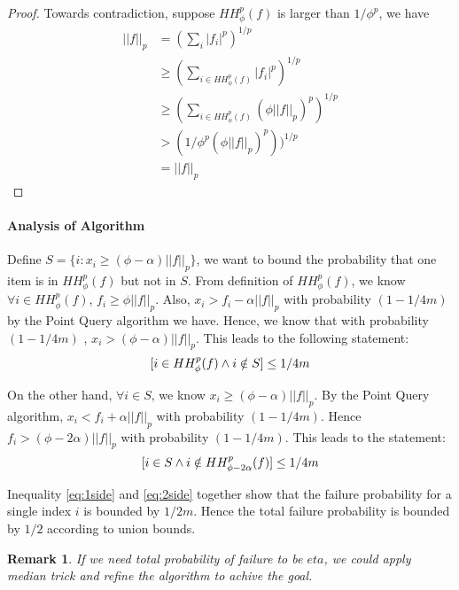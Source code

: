 \documentclass[11pt]{article}
\theoremstyle{plain}
\newtheorem{remark}[theorem]{Remark}
\let\Pr\relax
\DeclareMathOperator*{\Pr}{\mathbb{P}}
\begin{document}
\begin{proof}
Towards contradiction, suppose $HH_{\phi}^p(f)$ is larger than $1/\phi^p$, we 
have 
\begin{align*}
||f||_p&=(\sum_i |f_i|^p)^{1/p}\\
&\geq (\sum_{i\in HH_{\phi}^p(f)} |f_i|^p)^{1/p}\\
&\geq (\sum_{i\in HH_{\phi}^p(f)} (\phi||f||_p)^p)^{1/p}\\
&>(1/\phi^p (\phi||f||_p)^p))^{1/p}\\
&=||f||_p
\end{align*}
\end{proof}

\paragraph{Analysis of Algorithm}
Define $S=\{i: x_i \geq (\phi-\alpha)||f||_p \}$, we want to bound the probability 
that one item is in $HH_{\phi}^p(f)$ but not in $S$. From definition of  
$HH_{\phi}^p(f)$, we know $\forall i \in HH_{\phi}^p(f)$, $f_i\geq \phi||f||_p$. 
Also, $x_i> f_i -\alpha||f||_p$ with probability $(1-1/4m)$ by the Point 
Query algorithm we have. Hence, we know that with probability $(1-1/4m)$ , 
$x_i> (\phi-\alpha)||f||_p $. This leads to the following statement:
\begin{equation}
\label{eq:1side}
\Pr[i\in HH_{\phi}^p(f) \wedge i\notin S]\leq 1/4m
\end{equation}

On the other hand, $\forall i \in S$, we know $x_i \geq (\phi-\alpha)||f||_p$. 
By the Point Query algorithm, $x_i < f_i + \alpha||f||_p$ with probability 
$(1-1/4m)$. Hence $f_i>(\phi-2\alpha)||f||_p$ with probability $(1-1/4m)$. This 
leads to the statement:
\begin{equation}
\label{eq:2side}
\Pr[i\in S \wedge i\notin HH_{\phi-2\alpha}^p(f)]\leq 1/4m
\end{equation}

Inequality \ref{eq:1side} and \ref{eq:2side} together show that the failure 
probability for a 
single index $i$ is bounded by $1/2m$. Hence the total failure probability is 
bounded by $1/2$ according to union bounds. 

\begin{remark}
If we need total probability of failure to be $eta$, we could apply median trick 
and refine the algorithm to achive the goal. 
\end{remark}
\end{document}
